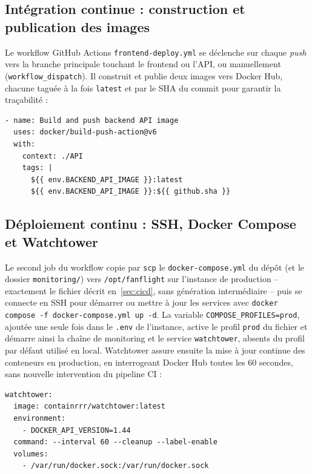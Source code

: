 \documentclass[11pt,a4paper]{report}
\newcommand{\code}[1]{\lstinline{#1}}
\begin{document}
\subsection{Intégration continue : construction et publication des images}

Le workflow GitHub Actions \code{frontend-deploy.yml} se déclenche sur chaque \emph{push} vers la branche principale touchant le frontend ou l'API, ou manuellement (\code{workflow_dispatch}). Il construit et publie deux images vers Docker Hub, chacune taguée à la fois \code{latest} et par le SHA du commit pour garantir la traçabilité :

\begin{lstlisting}[caption={Extrait du workflow -- publication taguée par SHA}]
- name: Build and push backend API image
  uses: docker/build-push-action@v6
  with:
    context: ./API
    tags: |
      ${{ env.BACKEND_API_IMAGE }}:latest
      ${{ env.BACKEND_API_IMAGE }}:${{ github.sha }}
\end{lstlisting}

\subsection{Déploiement continu : SSH, Docker Compose et Watchtower}

Le second job du workflow copie par \code{scp} le \code{docker-compose.yml} du dépôt (et le dossier \code{monitoring/}) vers \code{/opt/fanflight} sur l'instance de production -- exactement le fichier décrit en~\ref{sec:cicd}, sans génération intermédiaire -- puis se connecte en SSH pour démarrer ou mettre à jour les services avec \code{docker compose -f docker-compose.yml up -d}. La variable \code{COMPOSE_PROFILES=prod}, ajoutée une seule fois dans le \code{.env} de l'instance, active le profil \code{prod} du fichier et démarre ainsi la chaîne de monitoring et le service \code{watchtower}, absents du profil par défaut utilisé en local. Watchtower assure ensuite la mise à jour continue des conteneurs en production, en interrogeant Docker Hub toutes les 60 secondes, sans nouvelle intervention du pipeline CI :

\begin{lstlisting}[caption={Service Watchtower -- mise à jour continue en production}, label={lst:watchtower}]
watchtower:
  image: containrrr/watchtower:latest
  environment:
    - DOCKER_API_VERSION=1.44
  command: --interval 60 --cleanup --label-enable
  volumes:
    - /var/run/docker.sock:/var/run/docker.sock
\end{lstlisting}
\end{document}
